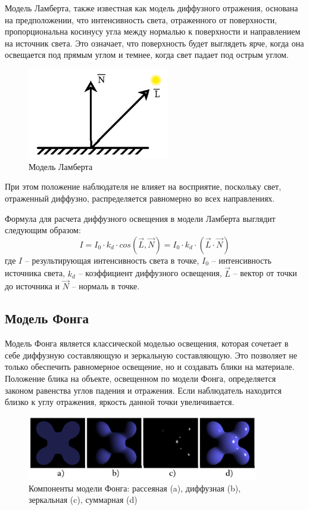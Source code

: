 Модель Ламберта, также известная как модель диффузного отражения, основана на предположении, что интенсивность света, отраженного от поверхности, пропорциональна косинусу угла между нормалью к поверхности и направлением на источник света. Это означает, что поверхность будет выглядеть ярче, когда она освещается под прямым углом и темнее, когда свет падает под острым углом. 
\begin{figure}[h] 
	\centering
	\includegraphics[width=0.55\textwidth]{images/lambert.png}
	\caption{Модель Ламберта} 
	\label{fig:lambert} 
\end{figure}

При этом положение наблюдателя не влияет на восприятие, поскольку свет, отраженный диффузно, распределяется равномерно во всех направлениях.

Формула для расчета диффузного освещения в модели Ламберта выглядит следующим образом:
\begin{equation}
	I = I_0 \cdot k_d \cdot cos(\vec{L}, \vec{N}) = I_0 \cdot k_d \cdot (\vec{L} \cdot \vec{N})
	\label{eq:lambert}
\end{equation}
где $I$ -- результирующая интенсивность света в точке, $I_0$ -- интенсивность источника света, $k_d$ -- коэффициент диффузного освещения, $\vec{L}$ -- вектор от точки до источника и $\vec{N}$ -- нормаль в точке.

\subsection{Модель Фонга}
Модель Фонга является классической моделью освещения, которая сочетает в себе диффузную составляющую и зеркальную составляющую. Это позволяет не только обеспечить равномерное освещение, но и создавать блики на материале. Положение блика на объекте, освещенном по модели Фонга, определяется законом равенства углов падения и отражения. Если наблюдатель находится близко к углу отражения, яркость данной точки увеличивается.
\begin{figure}[h] 
	\centering
	\includegraphics[width=0.9\textwidth]{images/phong-example.png}
	\caption{Компоненты модели Фонга: рассеяная (a), диффузная (b), зеркальная (c), суммарная (d)} 
	\label{fig:phong-example} 
\end{figure}

